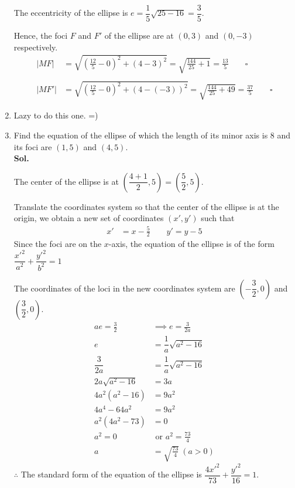 \documentclass{report}
\newcommand{\sol}{\vspace{1em}\\\textbf{Sol.}}
\newcommand{\eos}{ \qquad \square}
\begin{document}
\begin{enumerate}[leftmargin=*]
          The eccentricity of the ellipse is $e = \dfrac{1}{5}\sqrt{25 - 16} =
              \dfrac{3}{5}$.

          Hence, the foci $F$ and $F'$ of the ellipse are at $(0, 3)$ and $(0, -3)$
          respectively.
          \begin{align*}
              |MF|  & = \sqrt{\left(\frac{12}{5} - 0\right)^2 + (4 - 3)^2} = \sqrt{\frac{144}{25} + 1} = \frac{13}{5} \eos     \\
              \\
              |MF'| & = \sqrt{\left(\frac{12}{5} - 0\right)^2 + (4 - (-3))^2} = \sqrt{\frac{144}{25} + 49} = \frac{37}{5} \eos
          \end{align*}

    \item Lazy to do this one. =)
    \item Find the equation of the ellipse of which the length of its minor axis is 8 and
          its foci are $(1, 5)$ and $(4, 5)$. \sol{}

          The center of the ellipse is at $\left(\dfrac{4 + 1}{2}, 5\right) =
              \left(\dfrac{5}{2}, 5\right)$.

          Translate the coordinates system so that the center of the ellipse is at the
          origin, we obtain a new set of coordinates $(x', y')$ such that
          \begin{align*}
              x' & = x - \frac{5}{2}\qquad y' = y - 5
          \end{align*}
          Since the foci are on the $x$-axis, the equation of the ellipse is of the form $\dfrac{x'^2}{a^2} + \dfrac{y'^2}{b^2} = 1$

          The coordinates of the loci in the new coordinates system are
          $\left(-\dfrac{3}{2}, 0\right)$ and $\left(\dfrac{3}{2}, 0\right)$.
          \begin{align*}
              ae = \frac{3}{2}  & \implies e = \frac{3}{2a}      \\
              e                 & = \dfrac{1}{a}\sqrt{a^2 - 16}  \\
              \dfrac{3}{2a}     & = \dfrac{1}{a}\sqrt{a^2 - 16}  \\
              2a\sqrt{a^2 - 16} & = 3a                           \\
              4a^2(a^2 - 16)    & = 9a^2                         \\
              4a^4 - 64a^2      & = 9a^2                         \\
              a^2(4a^2 - 73)    & = 0                            \\
              a^2 = 0           & \text{ or } a^2 = \frac{73}{4} \\
              a                 & = \sqrt{\frac{73}{4}}\ (a > 0)
          \end{align*}
          $\therefore$ The standard form of the equation of the ellipse is $\dfrac{4x'^2}{73} + \dfrac{y'^2}{16} = 1$.


\end{enumerate}
\end{document}
